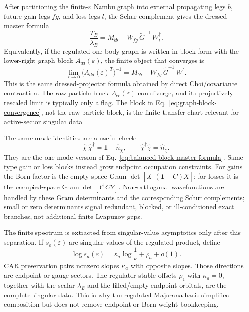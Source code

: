 \documentclass[aps,prb,onecolumn,nofootinbib,superscriptaddress]{revtex4-2}
\newcommand{\I}{\mathbf{1}}
\theoremstyle{plain}
\theoremstyle{definition}
\begin{document}
After partitioning the finite-\(\varepsilon\) Nambu graph into external
propagating legs \(b\), future-gain legs \(fg\), and loss legs \(l\), the
Schur complement gives the dressed master formula
\begin{equation}
  \frac{T_B}{\lambda_B}
  =
  M_{bb}-W_{fg}\,\widetilde G^{-1}\,W_l^\dagger .
  \label{eq:balanced-block-master-formula}
\end{equation}
Equivalently, if the regulated one-body graph is written in block form with
the lower-right graph block \(A_{dd}(\varepsilon)\), the finite object that
converges is
\begin{equation}
  \lim_{\varepsilon\to0}
  \bigl(A_{dd}(\varepsilon)^T\bigr)^{-1}
  =
  M_{bb}-W_{fg}\,\widetilde G^{-1}\,W_l^\dagger .
  \label{eq:graph-block-convergence}
\end{equation}
This is the same dressed-projector formula obtained by direct Choi/covariance
contraction.  The raw particle block \(A_{cc}(\varepsilon)\) can diverge, and
its projectively rescaled limit is typically only a flag.  The block in
Eq.~\eqref{eq:graph-block-convergence}, not the raw particle block, is the
finite transfer chart relevant for active-sector singular data.

The same-mode identities are a useful check:
\begin{equation}
  \hat\chi\,\hat\chi^\dagger=\I-\hat n_\chi,
  \qquad
  \hat\chi^\dagger\hat\chi=\hat n_\chi .
  \label{eq:gain-loss-same-mode-closures-chart}
\end{equation}
They are the one-mode version of Eq.~\eqref{eq:balanced-block-master-formula}.
Same-type gain or loss blocks instead grow endpoint occupation constraints.
For gains the Born factor is the empty-space Gram
\(\det[X^\dagger(\I-C)X]\); for losses it is the occupied-space Gram
\(\det[Y^\dagger C Y]\).  Non-orthogonal wavefunctions are handled by these
Gram determinants and the corresponding Schur complements; small or zero
determinants signal redundant, blocked, or ill-conditioned exact branches,
not additional finite Lyapunov gaps.

The finite spectrum is extracted from singular-value asymptotics only after
this separation.  If \(s_a(\varepsilon)\) are singular values of the
regulated product, define
\begin{equation}
  \log s_a(\varepsilon)
  =
  \kappa_a\log\frac{1}{\varepsilon}
  +
  \rho_a
  +
  o(1).
  \label{eq:regulated-singular-value-asymptotics}
\end{equation}
CAR preservation pairs nonzero slopes \(\kappa_a\) with opposite slopes.
Those directions are endpoint or gauge sectors.  The regulator-stable
offsets \(\rho_a\) with \(\kappa_a=0\), together with the scalar
\(\lambda_B\) and the filled/empty endpoint orbitals, are the complete
singular data.  This is why the regulated Majorana basis simplifies
composition but does not remove endpoint or Born-weight bookkeeping.
\end{document}
